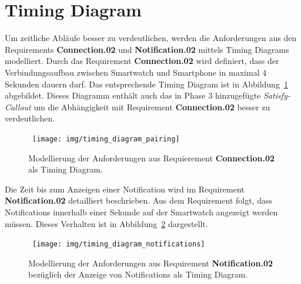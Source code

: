 \section{Timing Diagram}
Um zeitliche Abläufe besser zu verdeutlichen, werden die Anforderungen aus den Requirements \textbf{Connection.02} und \textbf{Notification.02} mittels Timing Diagrams modelliert. Durch das Requirement \textbf{Connection.02} wird definiert, dass der Verbindungsaufbau zwischen Smartwatch und Smartphone in maximal 4 Sekunden dauern darf. Das entsprechende Timing Diagram ist in Abbildung~\ref{fig:timing_diagram_pairing} abgebildet. Dieses Diagramm enthält auch das in Phase 3 hinzugefügte \textit{Satisfy-Callout} um die Abhängigkeit mit Requirement \textbf{Connection.02} besser zu verdeutlichen.

\begin{figure}[h]
\centering\
\texttt{[image: img/timing\_diagram\_pairing]}
\caption[Timing Diagram: Pairing]{Modellierung der Anforderungen aus Requierement \textbf{Connection.02} als Timing Diagram. }
\label{fig:timing_diagram_pairing}
\end{figure}

Die Zeit bis zum Anzeigen einer \gls{Notification} wird im Requirement \textbf{Notification.02} detailliert beschrieben. Aus dem Requirement folgt, dass \glspl{Notification} innerhalb einer Sekunde auf der Smartwatch angezeigt werden müssen. Dieses Verhalten ist in Abbildung~\ref{fig:timing_diagram_notifications} dargestellt.

\begin{figure}[h]
\centering\
\texttt{[image: img/timing\_diagram\_notifications]}
\caption[Timing Diagram: Notifications]{Modellierung der Anforderungen aus Requirement \textbf{Notification.02} bezüglich der Anzeige von \glspl{Notification} als Timing Diagram.}
\label{fig:timing_diagram_notifications}
\end{figure}
